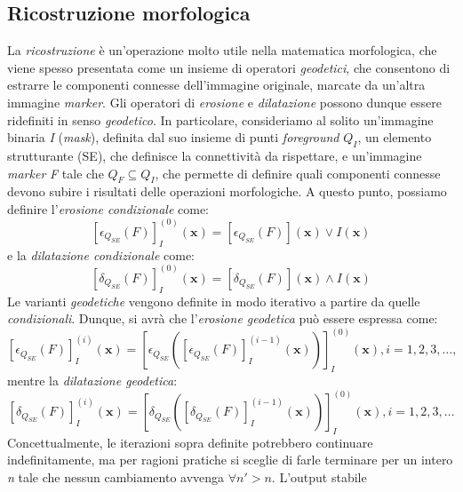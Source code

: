 \subsection{Ricostruzione morfologica}
\label{subsec:math-morph-reconstruction}
La \textit{ricostruzione} \`e un'operazione molto utile nella matematica morfologica, che viene spesso presentata come un insieme di operatori \textit{geodetici}, che consentono di estrarre le componenti connesse dell'immagine originale, marcate da un'altra immagine \textit{marker}. Gli operatori di \textit{erosione} e \textit{dilatazione} possono dunque essere ridefiniti in senso \textit{geodetico}. In particolare, consideriamo al solito un'immagine binaria \textit{I} (\textit{mask}), definita dal suo insieme di punti \textit{foreground} $Q_{I}$, un elemento strutturante (SE), che definisce la connettivit\`a da rispettare, e un'immagine \textit{marker} \textit{F} tale che $Q_{F} \subseteq Q_{I}$, che permette di definire quali componenti connesse devono subire i risultati delle operazioni morfologiche. A questo punto, possiamo definire l'\textit{erosione condizionale} come:
\begin{equation}
	\label{eq:conditional-erosion}
	[\epsilon_{Q_{SE}}(F)]^{(0)}_{I}(\textbf{x}) = [\epsilon_{Q_{SE}}(F)](\textbf{x}) \vee I(\textbf{x})
\end{equation}
e la \textit{dilatazione condizionale} come:
\begin{equation}
	\label{eq:conditional-dilation}
	[\delta_{Q_{SE}}(F)]^{(0)}_{I}(\textbf{x}) = [\delta_{Q_{SE}}(F)](\textbf{x}) \wedge I(\textbf{x})
\end{equation}
Le varianti \textit{geodetiche} vengono definite in modo iterativo a partire da quelle \textit{condizionali}. Dunque, si avr\`a che l'\textit{erosione geodetica} pu\`o essere espressa come:
\begin{equation}
	\label{eq:geodesic-erosion}
	[\epsilon_{Q_{SE}}(F)]^{(i)}_{I}(\textbf{x}) = [\epsilon_{Q_{SE}}([\epsilon_{Q_{SE}}(F)]^{(i-1)}_{I}(\textbf{x}))]^{(0)}_{I}(\textbf{x}), i=1,2,3,\dots,
\end{equation}
mentre la \textit{dilatazione geodetica}:
\begin{equation}
	\label{eq:geodesic-dilation}
	[\delta_{Q_{SE}}(F)]^{(i)}_{I}(\textbf{x}) = [\delta_{Q_{SE}}([\delta_{Q_{SE}}(F)]^{(i-1)}_{I}(\textbf{x}))]^{(0)}_{I}(\textbf{x}), i=1,2,3,\dots
\end{equation}
Concettualmente, le iterazioni sopra definite potrebbero continuare indefinitamente, ma per ragioni pratiche si sceglie di farle terminare per un intero \textit{n} tale che nessun cambiamento avvenga $\forall n' > n$. L'output stabile 
